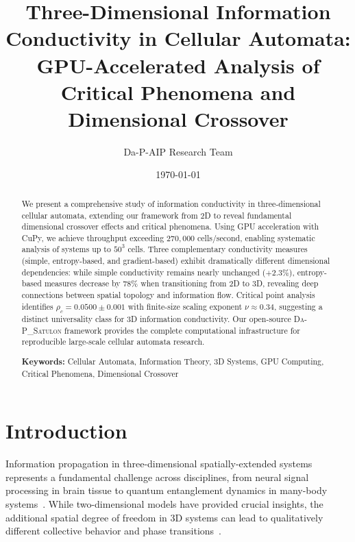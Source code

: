 \documentclass[twocolumn,showpacs,preprintnumbers,amsmath,amssymb,prb]{revtex4-2}
\newcommand{\satulon}{\textsc{Da-P\_Satulon}}
\begin{document}

\title{Three-Dimensional Information Conductivity in Cellular Automata: \\
GPU-Accelerated Analysis of Critical Phenomena and Dimensional Crossover}

\author{Da-P-AIP Research Team}

\date{\today}

\begin{abstract}
We present a comprehensive study of information conductivity in three-dimensional cellular automata, extending our framework from 2D to reveal fundamental dimensional crossover effects and critical phenomena. Using GPU acceleration with CuPy, we achieve throughput exceeding $270,000$ cells/second, enabling systematic analysis of systems up to $50^3$ cells. Three complementary conductivity measures (simple, entropy-based, and gradient-based) exhibit dramatically different dimensional dependencies: while simple conductivity remains nearly unchanged ($+2.3\%$), entropy-based measures decrease by $78\%$ when transitioning from 2D to 3D, revealing deep connections between spatial topology and information flow. Critical point analysis identifies $\rho_c = 0.0500 \pm 0.001$ with finite-size scaling exponent $\nu \approx 0.34$, suggesting a distinct universality class for 3D information conductivity. Our open-source \satulon{} framework provides the complete computational infrastructure for reproducible large-scale cellular automata research.

\textbf{Keywords:} Cellular Automata, Information Theory, 3D Systems, GPU Computing, Critical Phenomena, Dimensional Crossover
\end{abstract}


\maketitle

\section{Introduction}
\label{sec:introduction}

Information propagation in three-dimensional spatially-extended systems represents a fundamental challenge across disciplines, from neural signal processing in brain tissue to quantum entanglement dynamics in many-body systems~\cite{nielsen2010quantum}. While two-dimensional models have provided crucial insights, the additional spatial degree of freedom in 3D systems can lead to qualitatively different collective behavior and phase transitions~\cite{wolfram2002new}.
\end{document}
